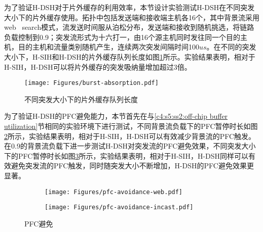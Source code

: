 

\label{c4:s5:ss2:off-chip buffer utilization}

为了验证H-DSH对于片外缓存的利用效率，本节设计实验测试H-DSH在不同突发大小下的片外缓存使用。拓扑中包括发送端和接收端主机各16个，其中背景流采用web \ search\cite{SIGCOMM10DCTCP}模式，流发送时间服从泊松分布，发送端和接收到随机挑选，将链路负载控制到0.9；突发流形式为十六打一，由16个源主机同时发往同一个目的主机，目的主机和流量类别随机产生，连续两次突发间隔时间100$us$。在不同的突发大小下，H-SIH和H-DSH的片外缓存队列长度如图\ref{c4:s1:ss1:fig:burst absorption}所示。实验结果表明，相对于H-SIH，H-DSH可以将片外缓存的突发吸纳量增加超过3倍。

\begin{figure}[H]
  \centering
  \texttt{[image: Figures/burst-absorption.pdf]}
  \caption{不同突发大小下的片外缓存队列长度}
  \label{c4:s1:ss1:fig:burst absorption}
\end{figure}

\label{c4:s5:ss2:pfc avoidance hdsh}

为了验证H-DSH的PFC避免能力，本节首先在与\ref{c4:s5:ss2:off-chip buffer utilization}节相同的实验环境下进行测试，不同背景流负载下的PFC暂停时长如图\ref{c3:s3:ss4:fig:sub1:web flow pfc avoidance}所示，实验结果表明，相对于H-SIH，H-DSH可以有效减少背景流的PFC触发。在0.9的背景流负载下进一步测试H-DSH对突发流的PFC避免效果，不同突发大小下的PFC暂停时长如图\ref{c3:s3:ss4:fig:sub1:incast flow pfc avoidance}所示，实验结果表明，相对于H-SIH，H-DSH同样可以有效避免突发流的PFC触发，同时随突发大小不断增加，H-DSH的PFC避免效果更显著。

\begin{figure}[H]
  \begin{subfigure}[b]{0.49\linewidth}
      \centering
      \texttt{[image: Figures/pfc-avoidance-web.pdf]}
      \label{c3:s3:ss4:fig:sub1:web flow pfc avoidance}
  \end{subfigure}
  \begin{subfigure}[b]{0.49\linewidth}
      \centering
      \texttt{[image: Figures/pfc-avoidance-incast.pdf]}
      \label{c3:s3:ss4:fig:sub1:incast flow pfc avoidance}
  \end{subfigure}
  \caption{PFC避免}
  \label{c3:s3:ss4:fig:hdsh pfc avoidance}
\end{figure}

